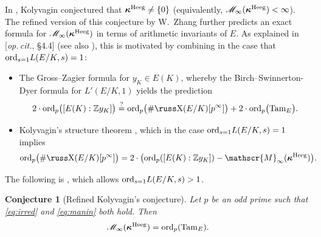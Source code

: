 \documentclass[10pt,reqno]{amsart}
\numberwithin{equation}{section}
\theoremstyle{plain}
\theoremstyle{definition}
\theoremstyle{definition}
\theoremstyle{plain}
\theoremstyle{plain}
\theoremstyle{plain}
\theoremstyle{plain}
\theoremstyle{plain}
\theoremstyle{plain}
\newtheorem{conjintro}{Conjecture}
\newcommand{\Z}{\mathbb{Z}}
\def\sha{\hbox{\russ\char88}}
\begin{document}
In \cite{kolystructure}, Kolyvagin conjectured that $\boldsymbol{\kappa}^{\rm Heeg}\neq\{0\}$ (equivalently,  $\mathscr{M}_\infty(\boldsymbol{\kappa}^{\rm Heeg})<\infty$). The refined version of this conjecture by W.~Zhang \cite{zhang-CDM} further predicts an exact formula for $\mathscr{M}_\infty(\boldsymbol{\kappa}^{\rm Heeg})$ in terms of arithmetic invariants of $E$. As explained in [\emph{op.\,cit.}, \S{4.4}] (see also \cite[\S{1}]{jetchev}), this is motivated by combining in the case that ${\rm ord}_{s=1}L(E/K,s)=1$:
\begin{itemize}
\item The Gross--Zagier formula for $y_K\in E(K)$, whereby the Birch--Swinnerton-Dyer formula for $L'(E/K,1)$ yields the prediction
\[
2\cdot{\rm ord}_p\bigl([E(K):\Z y_K]\bigr)\overset{?}={\rm ord}_p\bigl(\#\sha(E/K)[p^\infty]\big)+2\cdot{\rm ord}_p\bigl({\rm Tam}_E\bigr).
\]
\item Kolyvagin's structure theorem \cite{kolystructure}, 
which in the case ${\rm ord}_{s=1}L(E/K,s)=1$ implies
\begin{align*}
{\rm ord}_p\bigl(\#\sha(E/K)[p^\infty]\bigr)
&=2\cdot\bigl({\rm ord}_p([E(K):\Z y_K])-\mathscr{M}_\infty(\boldsymbol{\kappa}^{\rm Heeg})\bigr).
\end{align*}
\end{itemize}

The following is \cite[Conj.~4.5]{zhang-CDM}, which allows ${\rm ord}_{s=1}L(E/K,s)>1$. 

\begin{conjintro}[Refined Kolyvagin's  conjecture]\label{conj:refined-Kol}
Let $p$ be an odd prime such that \eqref{eq:irred} and \eqref{eq:manin} both hold. Then
\[
\mathscr{M}_\infty(\boldsymbol{\kappa}^{\rm Heeg})={\rm ord}_p({\rm Tam}_E).
\]
\end{conjintro}

\end{document}
